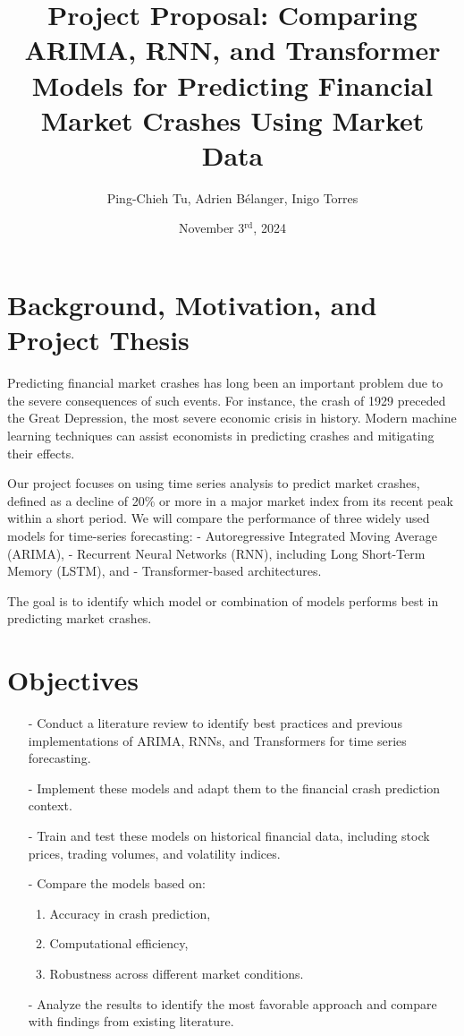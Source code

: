 \documentclass[12pt, letterpaper]{article}
\title{\Large Project Proposal: Comparing ARIMA, RNN, and Transformer Models for Predicting Financial Market Crashes Using Market Data\\}
\author{Ping-Chieh Tu, Adrien Bélanger, Inigo Torres}
\date{November 3$^{\text{rd}}$, 2024}
\begin{document}
\maketitle

\section*{Background, Motivation, and Project Thesis}
    Predicting financial market crashes has long been an important problem due to the severe consequences of such events. For instance, the crash of 1929 preceded the Great Depression, the most severe economic crisis in history. Modern machine learning techniques can assist economists in predicting crashes and mitigating their effects.

    Our project focuses on using time series analysis to predict market crashes, defined as a decline of 20\% or more in a major market index from its recent peak within a short period. We will compare the performance of three widely used models for time-series forecasting: 
    - Autoregressive Integrated Moving Average (ARIMA),
    - Recurrent Neural Networks (RNN), including Long Short-Term Memory (LSTM), and 
    - Transformer-based architectures.

    The goal is to identify which model or combination of models performs best in predicting market crashes.
\section*{Objectives}
    \begin{itemize}
        \item[-] Conduct a literature review to identify best practices and previous implementations of ARIMA, RNNs, and Transformers for time series forecasting.
        \item[-] Implement these models and adapt them to the financial crash prediction context.
        \item[-] Train and test these models on historical financial data, including stock prices, trading volumes, and volatility indices.
        \item[-] Compare the models based on:
          \begin{enumerate}[label=\alph*.]
            \item Accuracy in crash prediction,
            \item Computational efficiency,
            \item Robustness across different market conditions.
          \end{enumerate}
        \item[-] Analyze the results to identify the most favorable approach and compare with findings from existing literature.
    \end{itemize}
\end{document}
